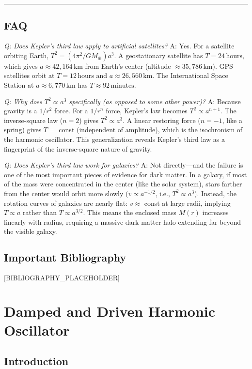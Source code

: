 \documentclass[11pt,openright]{book}
\begin{document}
\bigskip
\hrule
\bigskip
\section*{FAQ}

\textit{Q: Does Kepler's third law apply to artificial satellites?}
A: Yes. For a satellite orbiting Earth, $T^2 = (4\pi^2/GM_\oplus)a^3$. A geostationary satellite has $T = 24\,\text{hours}$, which gives $a \approx 42{,}164\,\text{km}$ from Earth's center (altitude $\approx 35{,}786\,\text{km}$). GPS satellites orbit at $T = 12\,\text{hours}$ and $a \approx 26{,}560\,\text{km}$. The International Space Station at $a \approx 6{,}770\,\text{km}$ has $T \approx 92\,\text{minutes}$.

\textit{Q: Why does $T^2 \propto a^3$ specifically (as opposed to some other power)?}
A: Because gravity is a $1/r^2$ force. For a $1/r^n$ force, Kepler's law becomes $T^2 \propto a^{n+1}$. The inverse-square law ($n = 2$) gives $T^2 \propto a^3$. A linear restoring force ($n = -1$, like a spring) gives $T = $ const (independent of amplitude), which is the isochronism of the harmonic oscillator. This generalization reveals Kepler's third law as a fingerprint of the inverse-square nature of gravity.

\textit{Q: Does Kepler's third law work for galaxies?}
A: Not directly---and the failure is one of the most important pieces of evidence for dark matter. In a galaxy, if most of the mass were concentrated in the center (like the solar system), stars farther from the center would orbit more slowly ($v \propto a^{-1/2}$, i.e., $T^2 \propto a^3$). Instead, the rotation curves of galaxies are nearly flat: $v \approx $ const at large radii, implying $T \propto a$ rather than $T \propto a^{3/2}$. This means the enclosed mass $M(r)$ increases linearly with radius, requiring a massive dark matter halo extending far beyond the visible galaxy.
\section*{Important Bibliography}

[BIBLIOGRAPHY_PLACEHOLDER]


\chapter{Damped and Driven Harmonic Oscillator}

\section*{Introduction}
\end{document}
